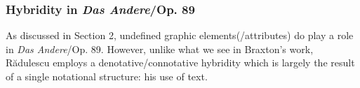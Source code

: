     \subsubsection{Hybridity in \textit{Das Andere}/Op. 89}


        As discussed in Section 2, undefined graphic elements(/attributes) do play a role in \textit{Das Andere}/Op. 89. However, unlike what we see in Braxton's work, R\u{a}dulescu employs a denotative/connotative hybridity which is largely the result of a single notational structure: his use of text.
    
